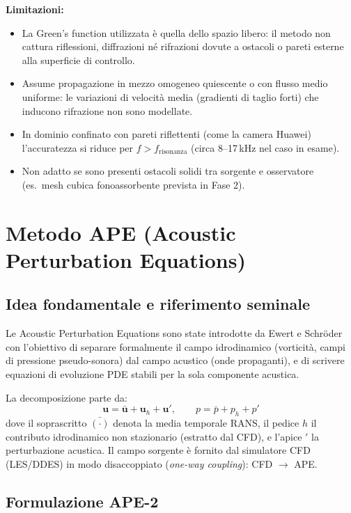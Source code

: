 \documentclass[11pt,a4paper]{article}
\begin{document}
\textbf{Limitazioni:}
\begin{itemize}
  \item La Green's function utilizzata è quella dello spazio libero: il metodo
        non cattura riflessioni, diffrazioni né rifrazioni dovute a ostacoli
        o pareti esterne alla superficie di controllo.
  \item Assume propagazione in mezzo omogeneo quiescente o con flusso medio
        uniforme: le variazioni di velocità media (gradienti di taglio forti)
        che inducono rifrazione non sono modellate.
  \item In dominio confinato con pareti riflettenti (come la camera Huawei)
        l'accuratezza si riduce per $f > f_\mathrm{risonanza}$
        (circa 8–17\,kHz nel caso in esame).
  \item Non adatto se sono presenti ostacoli solidi tra sorgente e osservatore
        (es.\ mesh cubica fonoassorbente prevista in Fase 2).
\end{itemize}

\section{Metodo APE (Acoustic Perturbation Equations)}
\label{sec:ape}

\subsection{Idea fondamentale e riferimento seminale}

Le Acoustic Perturbation Equations sono state introdotte da Ewert e
Schröder \cite{ewert2003} con l'obiettivo di separare formalmente il campo
idrodinamico (vorticità, campi di pressione pseudo-sonora) dal campo acustico
(onde propaganti), e di scrivere equazioni di evoluzione PDE stabili per
la sola componente acustica.

La decomposizione parte da:
\[
  \mathbf{u} = \mathbf{\bar{u}} + \mathbf{u}_h + \mathbf{u}', \qquad
  p = \bar{p} + p_h + p'
\]
dove il soprascritto $\bar{(\cdot)}$ denota la media temporale RANS,
il pedice $h$ il contributo idrodinamico non stazionario (estratto dal CFD),
e l'apice $'$ la perturbazione acustica.
Il campo sorgente è fornito dal simulatore CFD (LES/DDES) in modo disaccoppiato
(\textit{one-way coupling}): CFD $\to$ APE.

\subsection{Formulazione APE-2}
\end{document}
